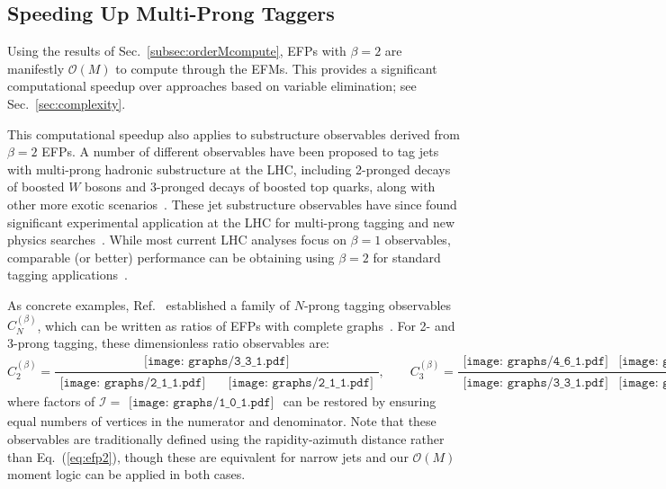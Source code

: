 \documentclass[aps,prd,floatfix,preprintnumbers,twocolumn,groupedaddress,nofootinbib,longbibliography,10pt]{revtex4-1}
\newcommand{\I}{\mathcal{I}}
\DeclareRobustCommand{\Sec}[1]{Sec.~\ref{#1}}
\DeclareRobustCommand{\Eq}[1]{Eq.~(\ref{#1})}
\DeclareRobustCommand{\Ref}[1]{Ref.~\cite{#1}}
\DeclareRobustCommand{\dotgraph}[1]{\begin{gathered}\texttt{[image: graphs/1\_0\_1.pdf]}\end{gathered}}
\DeclareRobustCommand{\linegraph}[1]{\begin{gathered}\texttt{[image: graphs/2\_1\_1.pdf]}\end{gathered}}
\DeclareRobustCommand{\triangle}[1]{\begin{gathered}\texttt{[image: graphs/3\_3\_1.pdf]}\end{gathered}}
\DeclareRobustCommand{\kite}[1]{\begin{gathered}\texttt{[image: graphs/4\_6\_1.pdf]}\end{gathered}}
\begin{document}
\subsection{Speeding Up Multi-Prong Taggers}
\label{sec:speedingcolliderobs}


Using the results of \Sec{subsec:orderMcompute}, EFPs with $\beta=2$ are manifestly $\mathcal O(M)$ to compute through the EFMs.
%
This provides a significant computational speedup over approaches based on variable elimination; see \Sec{sec:complexity}.

This computational speedup also applies to substructure observables derived from $\beta=2$ EFPs.
%
A number of different observables have been proposed to tag jets with multi-prong hadronic substructure at the LHC, including 2-pronged decays of boosted $W$ bosons and 3-pronged decays of boosted top quarks, along with other more exotic scenarios~\cite{Larkoski:2017jix,Marzani:2019hun}.
%
These jet substructure observables have since found significant experimental application at the LHC for multi-prong tagging and new physics searches~\cite{Asquith:2018igt}.
%
While most current LHC analyses focus on $\beta=1$ observables, comparable (or better) performance can be obtaining using $\beta = 2$ for standard tagging applications~\cite{Larkoski:2013eya,Larkoski:2014gra}.


As concrete examples, \Ref{Larkoski:2013eya} established a family of $N$-prong tagging observables $C_N^{(\beta)}$, which can be written as ratios of EFPs with complete graphs~\cite{Komiske:2017aww}.
%
For 2- and 3-prong tagging, these dimensionless ratio observables are:
%
\begin{equation}
C_2^{(\beta)} = \frac{\triangle{0.14}}{\linegraph{0.12}\quad \linegraph{0.12}}, \quad\quad C_3^{(\beta)} = \frac{\kite{0.14}\linegraph{0.12}}{\triangle{0.14}\triangle{0.14}},
\end{equation}
%
where factors of $\I = \dotgraph{0.02}$ can be restored by ensuring equal numbers of vertices in the numerator and denominator.
%
Note that these observables are traditionally defined using the rapidity-azimuth distance rather than \Eq{eq:efp2}, though these are equivalent for narrow jets and our $\mathcal O(M)$ moment logic can be applied in both cases.
\end{document}
